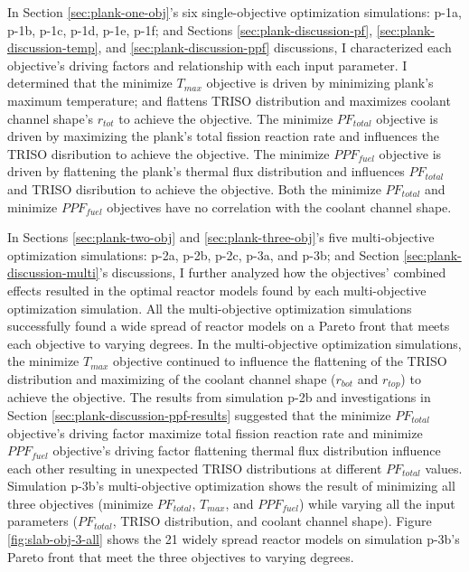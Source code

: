 In Section \ref{sec:plank-one-obj}'s six single-objective optimization simulations: 
p-1a, p-1b, p-1c, p-1d, p-1e, p-1f; and Sections \ref{sec:plank-discussion-pf}, 
\ref{sec:plank-discussion-temp}, and \ref{sec:plank-discussion-ppf} discussions,    
I characterized each objective's driving factors and relationship with each input 
parameter. 
I determined that the minimize $T_{max}$ objective is driven by minimizing plank's maximum 
temperature; and flattens TRISO distribution and maximizes coolant channel shape's 
$r_{tot}$ to achieve the objective. 
The minimize $PF_{total}$ objective is driven by maximizing the plank's total fission 
reaction rate and influences the TRISO disribution to achieve the objective. 
The minimize $PPF_{fuel}$ objective is driven by flattening the plank's thermal flux
distribution and influences $PF_{total}$ and TRISO disribution to achieve the objective. 
Both the minimize $PF_{total}$ and minimize $PPF_{fuel}$ objectives have no correlation 
with the coolant channel shape. 

In Sections \ref{sec:plank-two-obj} and \ref{sec:plank-three-obj}'s five multi-objective 
optimization simulations: p-2a, p-2b, p-2c, p-3a, and p-3b; and Section 
\ref{sec:plank-discussion-multi}'s discussions, I further analyzed how the objectives' 
combined effects resulted in the optimal reactor models found by each multi-objective 
optimization simulation. 
All the multi-objective optimization simulations successfully found a wide spread of 
reactor models on a Pareto front that meets each objective to varying degrees. 
In the multi-objective optimization simulations, the minimize $T_{max}$ objective 
continued to influence the flattening of the TRISO distribution and maximizing of the 
coolant channel shape ($r_{bot}$ and $r_{top}$) to achieve the objective. 
The results from simulation p-2b and investigations in Section 
\ref{sec:plank-discussion-ppf-results} suggested that the minimize $PF_{total}$ 
objective's driving factor maximize total fission reaction rate and 
minimize $PPF_{fuel}$ objective's driving factor flattening thermal flux distribution 
influence each other resulting in unexpected TRISO distributions at different 
$PF_{total}$ values. 
Simulation p-3b's multi-objective optimization shows the result of minimizing all 
three objectives (minimize $PF_{total}$, $T_{max}$, and $PPF_{fuel}$) while varying 
all the input parameters ($PF_{total}$, TRISO distribution, and coolant channel shape).
Figure \ref{fig:slab-obj-3-all} shows the 21 widely spread reactor models on simulation 
p-3b's Pareto front that meet the three objectives to varying degrees. 


